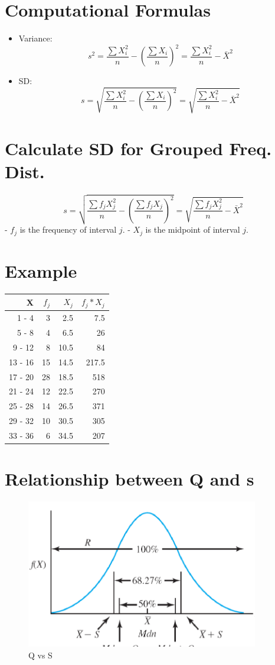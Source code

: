 \documentclass[12pt]{article}
\begin{document}
\section{Computational Formulas}\label{computational-formulas}

\begin{itemize}
\itemsep1pt\parskip0pt
\item
  Variance:
  \[ s^2 = \frac{\sum X_{i}^{2}}{n} - \left(\frac{\sum X_{i}}{n}\right)^2 = \frac{\sum X_{i}^{2}}{n} - \bar{X}^2 \]
\item
  SD:
  \[ s = \sqrt{\frac{\sum X_{i}^{2}}{n} - \left(\frac{\sum X_{i}}{n}\right)^2} = \sqrt{\frac{\sum X_{i}^{2}}{n} - \bar{X}^2} \]
\end{itemize}

\section{Calculate SD for Grouped Freq.
Dist.}\label{calculate-sd-for-grouped-freq.-dist.}

\[ s = \sqrt{\frac{\sum f_{j}X_{j}^{2}}{n} - \left(\frac{\sum f_{j}X_{j}}{n}\right)^2} = \sqrt{\frac{\sum f_{j}X_{j}^{2}}{n} - \bar{X}^2} \]
- \(f_{j}\) is the frequency of interval \(j\). - \(X_{j}\) is the
midpoint of interval \(j\).

\section{Example}\label{example-1}

\begin{longtable}[c]{@{}rrrr@{}}
\toprule
X & \(f_{j}\) & \(X_{j}\) & \(f_{j}*X_{j}\)\tabularnewline
\midrule
\endhead
1 - 4 & 3 & 2.5 & 7.5\tabularnewline
5 - 8 & 4 & 6.5 & 26\tabularnewline
9 - 12 & 8 & 10.5 & 84\tabularnewline
13 - 16 & 15 & 14.5 & 217.5\tabularnewline
17 - 20 & 28 & 18.5 & 518\tabularnewline
21 - 24 & 12 & 22.5 & 270\tabularnewline
25 - 28 & 14 & 26.5 & 371\tabularnewline
29 - 32 & 10 & 30.5 & 305\tabularnewline
33 - 36 & 6 & 34.5 & 207\tabularnewline
\bottomrule
\end{longtable}

\section{Relationship between Q and
s}\label{relationship-between-q-and-s}

\begin{figure}[H]
\centering
\includegraphics[width=4in]{QvsS.png}
\caption{Q vs S}
\end{figure}
\end{document}

